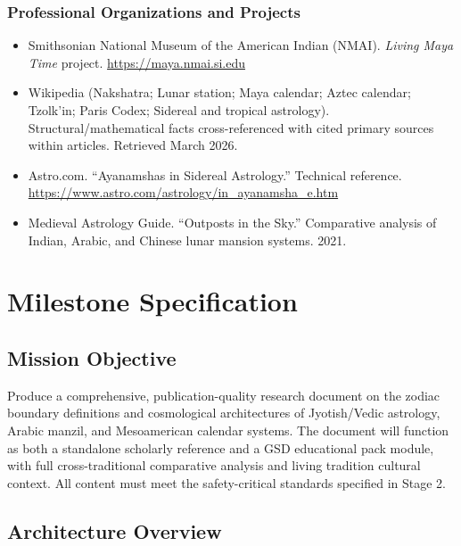 \documentclass[11pt,letterpaper]{article}
\newcommand{\stageheader}[2]{%
  \noindent\colorbox{#2}{\makebox[\textwidth][l]{%
    \textcolor{white}{\bfseries\sffamily\hspace{6pt}#1\hspace{6pt}}}}%
  \vspace{0.5em}\par%
}
\begin{document}
\subsubsection*{Professional Organizations and Projects}
\begin{itemize}[leftmargin=1.5em]
  \item Smithsonian National Museum of the American Indian (NMAI). \textit{Living Maya Time} project. \url{https://maya.nmai.si.edu}
  \item Wikipedia (Nakshatra; Lunar station; Maya calendar; Aztec calendar; Tzolk'in; Paris Codex; Sidereal and tropical astrology). Structural/mathematical facts cross-referenced with cited primary sources within articles. Retrieved March 2026.
  \item Astro.com. ``Ayanamshas in Sidereal Astrology.'' Technical reference. \url{https://www.astro.com/astrology/in\_ayanamsha\_e.htm}
  \item Medieval Astrology Guide. ``Outposts in the Sky.'' Comparative analysis of Indian, Arabic, and Chinese lunar mansion systems. 2021.
\end{itemize}

\newpage

\stageheader{STAGE 3 --- MISSION PACKAGE}{tertiary}

\section{Milestone Specification}

\subsection{Mission Objective}

Produce a comprehensive, publication-quality research document on the zodiac boundary definitions and cosmological architectures of Jyotish/Vedic astrology, Arabic manzil, and Mesoamerican calendar systems. The document will function as both a standalone scholarly reference and a GSD educational pack module, with full cross-traditional comparative analysis and living tradition cultural context. All content must meet the safety-critical standards specified in Stage 2.

\subsection{Architecture Overview}
\end{document}
